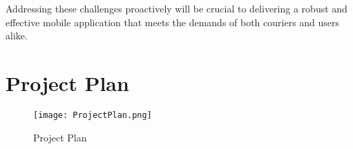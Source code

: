 \documentclass[a4paper,twoside,11pt]{article}
\begin{document}
Addressing these challenges proactively will be crucial to delivering a robust and effective mobile application that meets the demands of both couriers and users alike.

\section*{Project Plan}

\begin{figure}[h]
    \centering
    \texttt{[image: ProjectPlan.png]}
    \caption{Project Plan}
    \label{fig:project-plan}
\end{figure}



\end{document}
